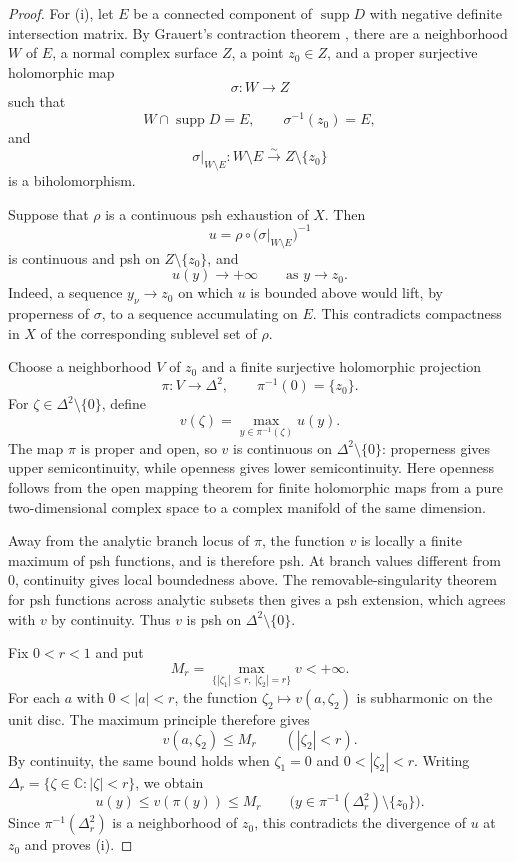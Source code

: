 \documentclass[11pt]{amsart}
\theoremstyle{definition}
\theoremstyle{remark}
\numberwithin{equation}{section}
\newcommand{\C}{\mathbb C}
\newcommand{\supp}{\operatorname{supp}}
\begin{document}
\begin{proof}
For \textup{(i)}, let $E$ be a connected component of $\supp D$
with negative definite intersection matrix. By Grauert's
contraction theorem
\cite[\S4, subsection~8(e)]{Grauert1962}, there are a neighborhood
$W$ of $E$, a normal complex surface $Z$, a point $z_0\in Z$,
and a proper surjective holomorphic map
\[
 \sigma:W\longrightarrow Z
\]
such that
\[
 W\cap\supp D=E,\qquad \sigma^{-1}(z_0)=E,
\]
and
\[
 \sigma|_{W\setminus E}:
 W\setminus E\xrightarrow{\sim}Z\setminus\{z_0\}
\]
is a biholomorphism.

Suppose that $\rho$ is a continuous psh exhaustion of $X$.
Then
\[
 u=\rho\circ
 \bigl(\sigma|_{W\setminus E}\bigr)^{-1}
\]
is continuous and psh on $Z\setminus\{z_0\}$, and
\[
 u(y)\longrightarrow+\infty\qquad\text{as }y\longrightarrow z_0.
\]
Indeed, a sequence $y_\nu\to z_0$ on which $u$ is bounded above
would lift, by properness of $\sigma$, to a sequence accumulating
on $E$. This contradicts compactness in $X$ of the corresponding
sublevel set of $\rho$.

Choose a neighborhood $V$ of $z_0$ and a finite surjective
holomorphic projection
\[
 \pi:V\longrightarrow\Delta^2,\qquad
 \pi^{-1}(0)=\{z_0\}.
\]
For $\zeta\in\Delta^2\setminus\{0\}$, define
\[
 v(\zeta)=\max_{y\in\pi^{-1}(\zeta)}u(y).
\]
The map $\pi$ is proper and open, so $v$ is continuous on
$\Delta^2\setminus\{0\}$: properness gives upper
semicontinuity, while openness gives lower semicontinuity.
Here openness follows from the open mapping theorem for finite
holomorphic maps from a pure two-dimensional complex space to
a complex manifold of the same dimension.

Away from the analytic branch locus of $\pi$, the function $v$
is locally a finite maximum of psh functions, and is therefore
psh. At branch values different from $0$, continuity gives local
boundedness above. The removable-singularity theorem for psh
functions across analytic subsets then gives a psh extension,
which agrees with $v$ by continuity. Thus $v$ is psh on
$\Delta^2\setminus\{0\}$.

Fix $0<r<1$ and put
\[
 M_r=
 \max_{\{|\zeta_1|\le r,\ |\zeta_2|=r\}}v
 <+\infty.
\]
For each $a$ with $0<|a|<r$, the function
$\zeta_2\mapsto v(a,\zeta_2)$ is subharmonic on the unit disc.
The maximum principle therefore gives
\[
 v(a,\zeta_2)\le M_r\qquad (|\zeta_2|<r).
\]
By continuity, the same bound holds when $\zeta_1=0$ and
$0<|\zeta_2|<r$. Writing
$\Delta_r=\{\zeta\in\C:|\zeta|<r\}$, we obtain
\[
 u(y)\le v(\pi(y))\le M_r
 \qquad
 \bigl(y\in\pi^{-1}(\Delta_r^2)\setminus\{z_0\}\bigr).
\]
Since $\pi^{-1}(\Delta_r^2)$ is a neighborhood of $z_0$,
this contradicts the divergence of $u$ at $z_0$ and proves
\textup{(i)}.


\end{proof}
\end{document}
